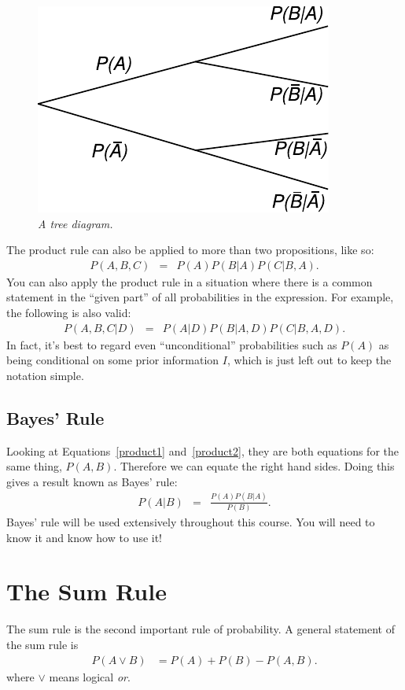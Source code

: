 \begin{figure}[!ht]
\begin{center}
\includegraphics[scale=0.9]{Figures/tree_diagram.pdf}
\caption{\it A tree diagram.\label{fig:tree_diagram}}
\end{center}
\end{figure}

The product rule can also be applied to more than two propositions, like so:
\begin{eqnarray}
P(A, B, C) &=& P(A)P(B|A)P(C|B,A).
\end{eqnarray}
You can also apply the product rule in a situation where there is a common
statement in the ``given part'' of all probabilities in the expression. For
example, the following is also valid:
\begin{eqnarray}
P(A, B, C | D) &=& P(A |D)P(B|A,D)P(C|B,A,D).
\end{eqnarray}
In fact, it's best to regard even ``unconditional'' probabilities such
as $P(A)$ as being conditional on some prior information $I$, which is just
left out to keep the notation simple.

\subsection{Bayes' Rule}
Looking at Equations~\ref{product1} and~\ref{product2}, they are both equations
for the same
thing, $P(A,B)$. Therefore we can equate the right hand sides. Doing this gives
a result known as Bayes' rule:
\begin{eqnarray}
P(A|B) &=& \frac{P(A)P(B|A)}{P(B)}. \label{bayes}
\end{eqnarray}
Bayes' rule will be used extensively throughout this course. You will need to
know it and know how to use it!

\section{The Sum Rule}
The sum rule is the second important rule of probability. A general statement
of the sum rule is
\begin{align}
P(A \vee B) &= P(A) + P(B) - P(A, B).
\end{align}
where $\vee$ means logical {\em or}.

